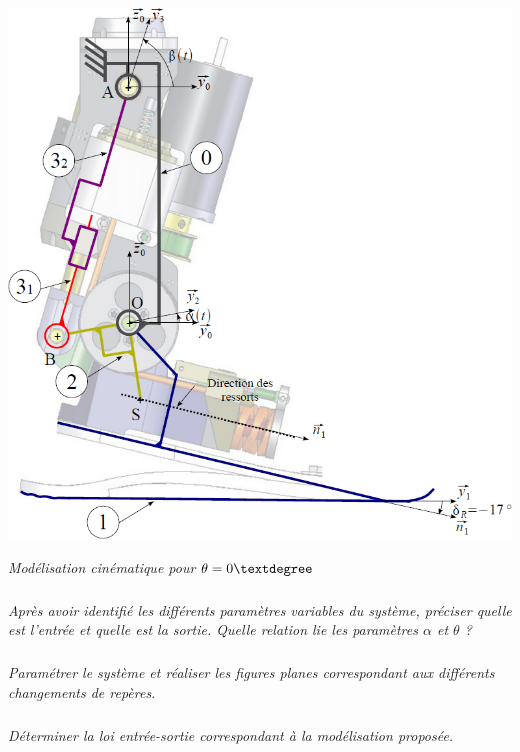 \documentclass[10pt]{article}
\begin{document}
\begin{minipage}[c]{.43\linewidth}
\begin{center}
\includegraphics[width=\textwidth]{images/prot_03}

\textit{Modélisation cinématique pour $\theta=0\textdegree$}
\end{center}
\end{minipage}

\subparagraph{}
\textit{Après avoir identifié les différents paramètres variables du système, préciser quelle est l'entrée et quelle est la sortie. Quelle relation lie les paramètres $\alpha$ et $\theta$ ?} 

\subparagraph{}
\textit{Paramétrer le système et réaliser les figures planes correspondant aux différents changements de repères.} 

\subparagraph{}
\textit{Déterminer la loi entrée-sortie correspondant à la modélisation proposée.} 
\end{document}
